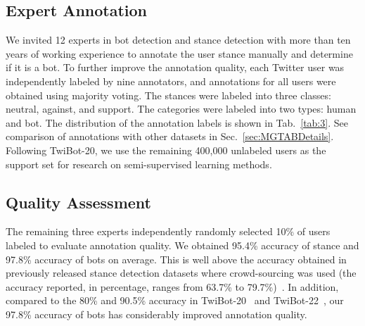 \documentclass[10pt,twocolumn,letterpaper]{article}
\begin{document}
\subsection{Expert Annotation}
\label{sec:datapre-2}
We invited 12 experts in bot detection and stance detection with more than ten years of working experience to annotate the user stance manually and determine if it is a bot. To further improve the annotation quality, each Twitter user was independently labeled by nine annotators, and annotations for all users were obtained using majority voting. The stances were labeled into three classes: neutral, against, and support. The categories were labeled into two types: human and bot. The distribution of the annotation labels is shown in Tab.~\ref{tab:3}. See comparison of annotations with other datasets in Sec.~\ref{sec:MGTABDetails}. Following TwiBot-20, we use the remaining 400,000 unlabeled users as the support set for research on semi-supervised learning methods.


\begin{table}[htbp]
  \centering
  \caption{Distribution of Labels in annotations.}
  \vspace{0.2cm}
\label{tab:3}
\end{table}

\subsection{Quality Assessment}
\label{sec:datapre-3}
The remaining three experts independently randomly selected 10\% of users labeled to evaluate annotation quality. We obtained 95.4\% accuracy of stance and 97.8\% accuracy of bots on average. This is well above the accuracy obtained in previously released stance detection datasets where crowd-sourcing was used (the accuracy reported, in percentage, ranges from 63.7\% to 79.7\%)~\cite{Alpher29}. In addition, compared to the 80\% and 90.5\% accuracy in TwiBot-20~\cite{Alpher11} and TwiBot-22~\cite{Alpher12}, our 97.8\% accuracy of bots has considerably improved annotation quality.
\end{document}
